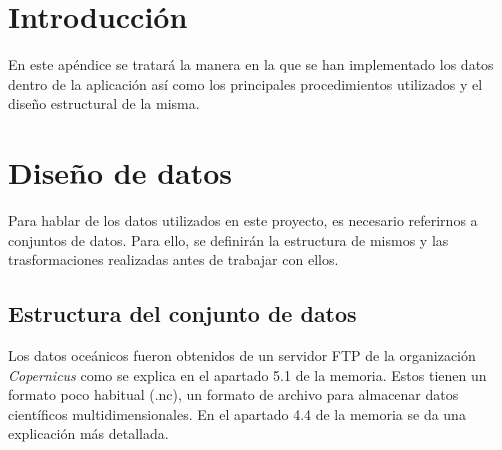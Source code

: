 
\section{Introducción}

En este apéndice se tratará la manera en la que se han implementado los datos dentro de la aplicación así como los principales procedimientos utilizados y el diseño estructural de la misma.

\section{Diseño de datos}

Para hablar de los datos utilizados en este proyecto, es necesario referirnos a conjuntos de datos. Para ello, se definirán la estructura de mismos y las trasformaciones realizadas antes de trabajar con ellos.

\subsection{Estructura del conjunto de datos}

Los datos oceánicos fueron obtenidos de un servidor FTP de la organización \emph{Copernicus} como se explica en el apartado 5.1 de la memoria. Estos tienen un formato poco habitual (.nc), un formato de archivo para almacenar datos científicos multidimensionales. En el apartado 4.4 de la memoria se da una explicación más detallada.

